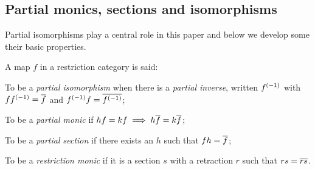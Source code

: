 \subsection{Partial monics, sections and isomorphisms} %
\label{sub:restricted_monics_sections_and_partial_isomorphisms}

Partial isomorphisms play a central role in this paper and below we develop
some their basic properties.

\begin{definition} A map $f$ in a restriction category \X is said:
\bi
\item To be a \emph{partial isomorphism} when there is a
 \emph{partial inverse}, written ${f}^{(-1)}$ with $f{f}^{(-1)} =\overline{f}$
and ${f}^{(-1)}f = \overline{{f}^{(-1)}}$;
\item To be a \emph{partial monic} if $h f = k f \implies
h \overline{f} = k \overline{f}$;
\item To be a \emph{partial section} if there exists an  $h$ such that $f h = \overline{f}$;
\item To be a \emph{restriction monic} if it is a section $s$ with a retraction
$r$ such that $r s = \overline{r s}$.
\ei
\end{definition}

